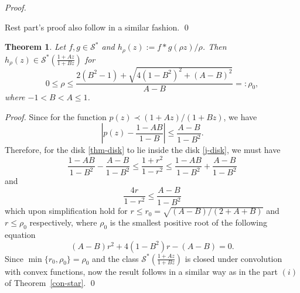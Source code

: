\documentclass[12pt, reqno]{amsart}
\numberwithin{equation}{section}
\theoremstyle{plain}
\newtheorem{theorem}{Theorem}[section]
\theoremstyle{definition}
\theoremstyle{remark}
\begin{document}
\begin{proof}
\begin{itemize}
	\end{itemize}
	Rest part's proof also follow in a similar fashion. \qed
\end{proof}


\begin{theorem}
	Let $f,g\in \mathcal{S}^*$ and $h_{\rho}(z):=f*g(\rho z)/\rho$. Then $h_{\rho}(z)\in \mathcal{S}^{*} \left(\frac{1+Az}{1+Bz} \right)$ for
	$$0\leq\rho\leq \frac{2(B^2-1)+\sqrt{4(1-B^2)^2+(A-B)^2}}{A-B}=:\rho_0,$$
	where $-1<B<A\leq1$.
\end{theorem}
\begin{proof}
	Since for the function $p(z)\prec {(1+Az)}/{(1+Bz)}$, we have 
	\begin{equation}\label{j-disk}
	\left|p(z)-\frac{1-AB}{1-B} \right|\leq \frac{A-B}{1-B^2}.
	\end{equation}
	Therefore, for the disk \eqref{thm-disk} to lie inside the disk \eqref{j-disk}, we must have
	$$\frac{1-AB}{1-B^2}- \frac{A-B}{1-B^2} \leq \frac{1+r^2}{1-r^2} \leq \frac{1-AB}{1-B^2}+\frac{A-B}{1-B^2}$$
	and
	$$\frac{4r}{1-r^2}\leq \frac{A-B}{1-B^2}$$
	which upon simplification hold for $r\leq r_0= \sqrt{(A-B)/(2+A+B)}$ and $r\leq\rho_0$ respectively, where $\rho_0$ is the smallest positive root of the following equation
	$$(A-B)r^2+4(1-B^2)r-(A-B)=0.$$
	Since $\min\{r_0,\rho_0\}=\rho_0$ and the class $\mathcal{S}^{*}\left(\frac{1+Az}{1+Bz}\right)$ is closed under convolution with convex functions, now the result follows in a similar way as in the part $(i)$ of Theorem~\ref{con-star}. \qed
\end{proof}
\end{document}
